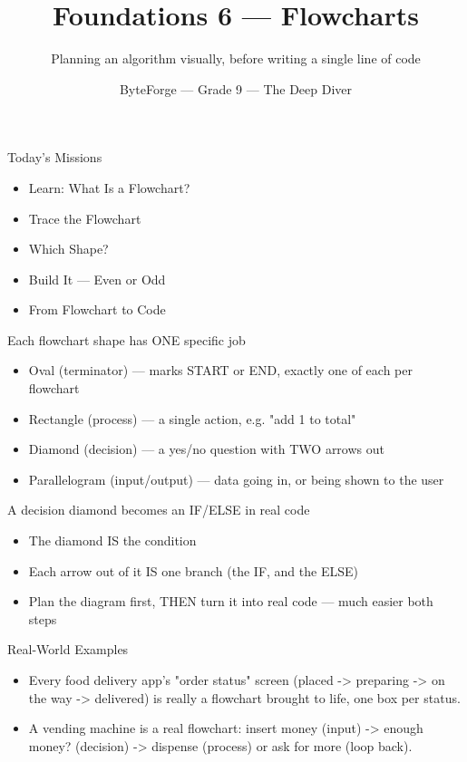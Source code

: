 \documentclass[aspectratio=169]{beamer}
\title{Foundations 6 — Flowcharts}
\subtitle{Planning an algorithm visually, before writing a single line of code}
\author{ByteForge --- Grade 9 --- The Deep Diver}
\date{}
\begin{document}
\begin{frame}
    \titlepage
\end{frame}

\begin{frame}{Today's Missions}
    \Large
    \begin{itemize}
        \item Learn: What Is a Flowchart?
        \item Trace the Flowchart
        \item Which Shape?
        \item Build It --- Even or Odd
        \item From Flowchart to Code
    \end{itemize}
\end{frame}

\begin{frame}{Each flowchart shape has ONE specific job}
    \large
    \begin{itemize}
        \item Oval (terminator) --- marks START or END, exactly one of each per flowchart
        \item Rectangle (process) --- a single action, e.g. "add 1 to total"
        \item Diamond (decision) --- a yes/no question with TWO arrows out
        \item Parallelogram (input/output) --- data going in, or being shown to the user
    \end{itemize}
\end{frame}


\begin{frame}{A decision diamond becomes an IF/ELSE in real code}
    \large
    \begin{itemize}
        \item The diamond IS the condition
        \item Each arrow out of it IS one branch (the IF, and the ELSE)
        \item Plan the diagram first, THEN turn it into real code --- much easier both steps
    \end{itemize}
\end{frame}

\begin{frame}{Real-World Examples}
    \large
    \begin{itemize}
        \item Every food delivery app's "order status" screen (placed -> preparing -> on the way -> delivered) is really a flowchart brought to life, one box per status.
        \item A vending machine is a real flowchart: insert money (input) -> enough money? (decision) -> dispense (process) or ask for more (loop back).
    \end{itemize}
\end{frame}
\end{document}
